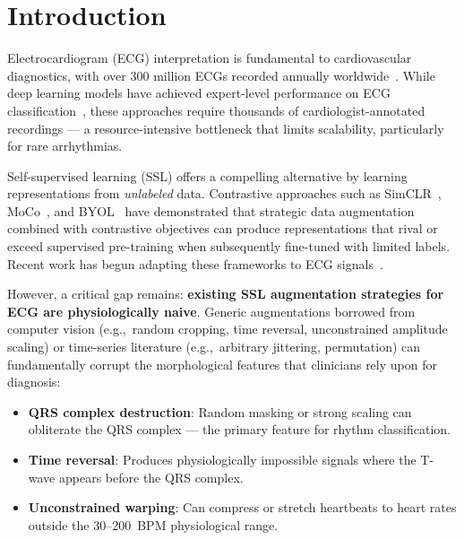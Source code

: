\documentclass[journal,10pt]{IEEEtran}
\newcommand{\eg}{e.g.,~}
\begin{document}

\section{Introduction}
\label{sec:introduction}

Electrocardiogram (ECG) interpretation is fundamental to cardiovascular diagnostics, with over 300 million ECGs recorded annually worldwide~\cite{Schlapfer2017}. While deep learning models have achieved expert-level performance on ECG classification~\cite{Hannun2019, Ribeiro2020}, these approaches require thousands of cardiologist-annotated recordings — a resource-intensive bottleneck that limits scalability, particularly for rare arrhythmias.

Self-supervised learning (SSL) offers a compelling alternative by learning representations from \emph{unlabeled} data. Contrastive approaches such as SimCLR~\cite{Chen2020SimCLR}, MoCo~\cite{He2020MoCo}, and BYOL~\cite{Grill2020BYOL} have demonstrated that strategic data augmentation combined with contrastive objectives can produce representations that rival or exceed supervised pre-training when subsequently fine-tuned with limited labels. Recent work has begun adapting these frameworks to ECG signals~\cite{Kiyasseh2021clocs, Mehari2023, Oh2022lead}.

However, a critical gap remains: \textbf{existing SSL augmentation strategies for ECG are physiologically naive}. Generic augmentations borrowed from computer vision (\eg random cropping, time reversal, unconstrained amplitude scaling) or time-series literature (\eg arbitrary jittering, permutation) can fundamentally corrupt the morphological features that clinicians rely upon for diagnosis:

\begin{itemize}
    \item \textbf{QRS complex destruction}: Random masking or strong scaling can obliterate the QRS complex — the primary feature for rhythm classification.
    \item \textbf{Time reversal}: Produces physiologically impossible signals where the T-wave appears before the QRS complex.
    \item \textbf{Unconstrained warping}: Can compress or stretch heartbeats to heart rates outside the 30--200~BPM physiological range.
\end{itemize}
\end{document}
